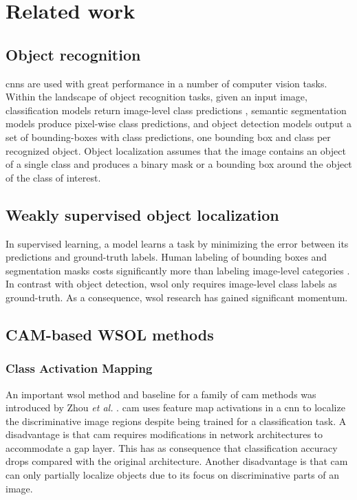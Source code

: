 \chapter{Related work} \label{ch:related_work}
\section{Object recognition}
\acrfull{cnn}s are used with great performance in a number of computer vision tasks. Within the landscape of object recognition tasks, given an input image, classification models return image-level class predictions \cite{lecun1998gradient}, semantic segmentation models \cite{shelhamer2017fully} produce pixel-wise class predictions, and object detection models \cite{girshick2014rich, girshick2015fast, ren2015faster} output a set of bounding-boxes with class predictions, one bounding box and class per recognized object. Object localization \cite{russakovsky2015imagenet} assumes that the image contains an object of a single class and produces a binary mask or a bounding box around the object of the class of interest.

\section{Weakly supervised object localization}
In supervised learning, a model learns a task by minimizing the error between its predictions and ground-truth labels. Human labeling of bounding boxes and segmentation masks costs significantly more than labeling image-level categories \cite{papandreou2015weakly}. In contrast with object detection, \acrshort{wsol} only requires image-level class labels as ground-truth. As a consequence,  \acrshort{wsol} research \cite{zhou2016cvpr, zhang2018adversarial, zhang2018self, choe2019attention, singh2017hide} has gained significant momentum.

\section{CAM-based WSOL methods}
\subsection{Class Activation Mapping}
An important \acrshort{wsol} method and baseline for a family of \acrshort{cam} methods was introduced by Zhou \textit{et al.} \cite{zhou2016cvpr}. \acrfull{cam} uses feature map activations in a \acrlong{cnn} to localize the discriminative image regions despite being trained for a classification task. A disadvantage is that \acrshort{cam} requires modifications in network architectures to accommodate a \acrlong{gap} layer. This has as consequence that classification accuracy drops compared with the original architecture. Another disadvantage is that \acrshort{cam} can only partially localize objects due to its focus on discriminative parts of an image. 

